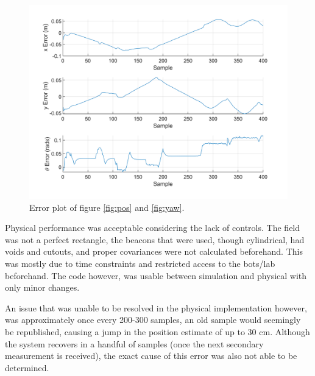 	\begin{figure}
	    	\captionsetup{width=\columnwidth}
	   	\centering
	   	\includegraphics[width=\columnwidth]{./graphics/Error.png}
	   	\caption{Error plot of figure \ref{fig:pos} and \ref{fig:yaw}.}
		\label{fig:err2}
	\end{figure}
	
	
	Physical performance was acceptable considering the lack of controls. The field was not a perfect rectangle, the beacons that were used, though cylindrical, had voids and cutouts, and proper covariances were not calculated beforehand. This was mostly due to time constraints and restricted access to the bots/lab beforehand. The code however, was usable between simulation and physical with only minor changes.\par
	An issue that was unable to be resolved in the physical implementation however, was approximately once every 200-300 samples, an old sample would seemingly be republished, causing a jump in the position estimate of up to 30 cm. Although the system recovers in a handful of samples (once the next secondary measurement is received), the exact cause of this error was also not able to be determined.\par